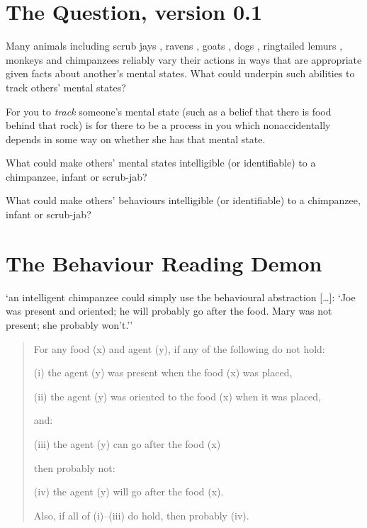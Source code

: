 \documentclass[12pt]{extarticle}
\begin{document}
\begin{multicols*}{3}
\section{The Question, version 0.1}

Many animals including scrub jays \citep{Clayton:2007fh},
ravens \citep{bugnyar:2016_ravens},
goats \citep{kaminski:2006_goats},
dogs \citep{kaminski:2009_domestic},
ringtailed lemurs \citep{sandel:2011_evidence},
monkeys \citep{burkart:2007_understanding, hattori:2009_tufted}
and chimpanzees \citep{melis:2006_chimpanzees,karg:2015_chimpanzees} reliably vary their actions in ways that are appropriate given facts about another’s mental states.
What could underpin such abilities to track others’ mental states?

For you to \emph{track} someone’s mental state (such as a belief that there is food behind that rock)
is for there to be a process in you which nonaccidentally depends in some way on whether she has that
mental state.

What could make others’ mental states intelligible (or identifiable) to a chimpanzee, infant or scrub-jab?


What could make others’ behaviours  intelligible (or identifiable)  to a chimpanzee, infant or scrub-jab?




\section{The Behaviour Reading Demon}

‘an intelligent chimpanzee could simply use the  behavioural abstraction […]:  ‘Joe was present and oriented; he will probably go after the food. Mary was not present; she probably won’t.’’
\citep{Povinelli:2003bg}

\begin{quote}
For any food (x) and agent (y), if any of the following do not hold:

(i) the agent (y) was present when the food (x) was placed,

(ii) the agent (y) was oriented to the food (x) when it was placed,

and:

(iii) the agent (y) can go after the food (x)

then probably not:

(iv) the agent (y) will go after the food (x).

Also, if all of (i)–(iii) do hold, then probably (iv).
\end{quote}


\end{multicols*}
\end{document}
